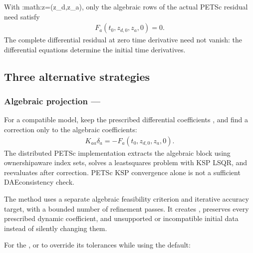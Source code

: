 \documentclass[letterpaper,10pt,english]{sphinxmanual}
\begin{document}
\sphinxAtStartPar
With :math:\textasciigrave{}z=(z\_d,z\_a)\textasciigrave{}, only the algebraic rows of
the actual PETSc residual need satisfy
\begin{equation*}
\begin{split}F_a(t_0,z_{d,0},z_a,0) = 0.\end{split}
\end{equation*}
\sphinxAtStartPar
The complete differential residual at zero time derivative
need not vanish: the differential equations determine
the initial time derivatives.


\subsection{Three alternative strategies}
\label{\detokenize{initialization:three-alternative-strategies}}

\subsubsection{Algebraic projection — }
\label{\detokenize{initialization:algebraic-projection-init-step-ts-type-algebraic}}
\sphinxAtStartPar
For a compatible  model, keep the prescribed
differential coefficients , and find a
correction only to the algebraic coefficients:
\begin{equation*}
\begin{split}K_{aa}\delta_a = -F_a(t_0,z_{d,0},z_a,0).\end{split}
\end{equation*}
\sphinxAtStartPar
The distributed PETSc implementation extracts the
algebraic block using ownership\sphinxhyphen{}aware index sets,
solves a least\sphinxhyphen{}squares problem with KSP LSQR,
and re\sphinxhyphen{}evaluates 
after correction. PETSc KSP convergence alone
is not a sufficient DAE\sphinxhyphen{}consistency check.

\sphinxAtStartPar
The method uses a separate algebraic feasibility criterion
and iterative accuracy target, with a bounded number of
refinement passes. It creates ,
preserves every prescribed dynamic coefficient, and
 unsupported or incompatible initial data
instead of silently changing them.

\sphinxAtStartPar
For the , or to override
its tolerances while using the default:
\end{document}

